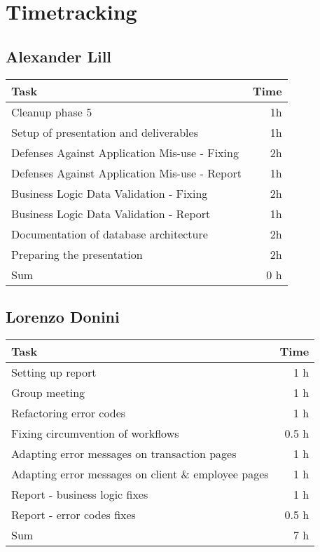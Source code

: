 \chapter{Timetracking}\label{chapter:timetracking}
\section*{Alexander Lill}
\begin{table}[h!tpb]
  \centering
  \begin{tabularx}{\textwidth}{X r}
    \toprule
      Task & Time \\
    \midrule
      Cleanup phase 5 & 1h \\
      Setup of presentation and deliverables & 1h \\
      Defenses Against Application Mis-use - Fixing & 2h \\
      Defenses Against Application Mis-use - Report & 1h \\
      Business Logic Data Validation - Fixing & 2h \\
      Business Logic Data Validation - Report & 1h \\
      Documentation of database architecture & 2h \\
      Preparing the presentation & 2h \\ %
    \midrule
      Sum & 0 h \\
    \bottomrule
  \end{tabularx}
\end{table}

\clearpage
\section*{Lorenzo Donini}
\begin{table}[h!tpb]
  \centering
  \begin{tabularx}{\textwidth}{X r}
    \toprule
      Task & Time \\
    \midrule
      Setting up report & 1 h \\      
      Group meeting & 1 h \\
      Refactoring error codes & 1 h \\
      Fixing circumvention of workflows & 0.5 h \\
      Adapting error messages on transaction pages & 1 h \\
      Adapting error messages on client \& employee pages & 1 h \\
      Report - business logic fixes & 1 h \\
      Report - error codes fixes & 0.5 h \\
    \midrule
      Sum & 7 h \\
    \bottomrule
  \end{tabularx}
\end{table}

